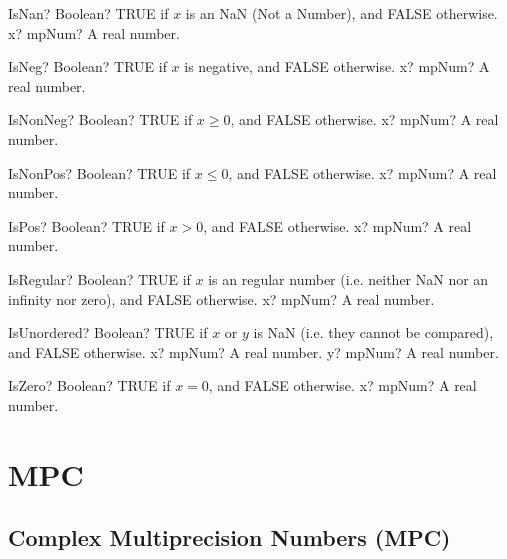 \documentclass[12pt,a4paper,openany]{book}
\begin{document}
\begin{mpFunctionsExtract}
\mpFunctionOne
{IsNan? Boolean? TRUE if $x$ is an NaN (Not a Number), and FALSE otherwise.}
{x? mpNum? A real number.}
\end{mpFunctionsExtract}

\begin{mpFunctionsExtract}
\mpFunctionOne
{IsNeg? Boolean? TRUE if $x$ is negative, and FALSE otherwise.}
{x? mpNum? A real number.}
\end{mpFunctionsExtract}

\begin{mpFunctionsExtract}
\mpFunctionOne
{IsNonNeg? Boolean? TRUE if $x \geq 0$, and FALSE otherwise.}
{x? mpNum? A real number.}
\end{mpFunctionsExtract}

\begin{mpFunctionsExtract}
\mpFunctionOne
{IsNonPos? Boolean? TRUE if $x \leq 0$, and FALSE otherwise.}
{x? mpNum? A real number.}
\end{mpFunctionsExtract}

\begin{mpFunctionsExtract}
\mpFunctionOne
{IsPos? Boolean? TRUE if $x > 0$, and FALSE otherwise.}
{x? mpNum? A real number.}
\end{mpFunctionsExtract}

\begin{mpFunctionsExtract}
\mpFunctionOne
{IsRegular? Boolean? TRUE if $x$ is an regular number (i.e. neither NaN nor an infinity nor zero), and FALSE otherwise.}
{x? mpNum? A real number.}
\end{mpFunctionsExtract}

\begin{mpFunctionsExtract}
\mpFunctionTwo
{IsUnordered? Boolean? TRUE if $x$ or $y$ is NaN (i.e. they cannot be compared), and FALSE otherwise.}
{x? mpNum? A real number.}
{y? mpNum? A real number.}
\end{mpFunctionsExtract}

\begin{mpFunctionsExtract}
\mpFunctionOne
{IsZero? Boolean? TRUE if $x = 0$, and FALSE otherwise.}
{x? mpNum? A real number.}
\end{mpFunctionsExtract}

\chapter{MPC}

\section{Complex Multiprecision Numbers (MPC)}
\end{document}

